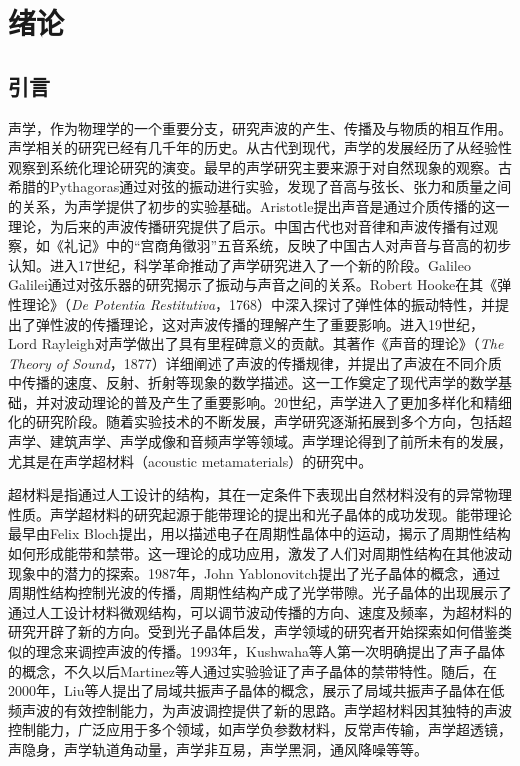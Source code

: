 \chapter{绪论}

\section{引言}
声学，作为物理学的一个重要分支，研究声波的产生、传播及与物质的相互作用。声学相关的研究已经有几千年的历史。从古代到现代，声学的发展经历了从经验性观察到系统化理论研究的演变。最早的声学研究主要来源于对自然现象的观察。古希腊的Pythagoras通过对弦的振动进行实验，发现了音高与弦长、张力和质量之间的关系，为声学提供了初步的实验基础。Aristotle提出声音是通过介质传播的这一理论，为后来的声波传播研究提供了启示。中国古代也对音律和声波传播有过观察，如《礼记》中的“宫商角徵羽”五音系统，反映了中国古人对声音与音高的初步认知。进入17世纪，科学革命推动了声学研究进入了一个新的阶段。Galileo Galilei通过对弦乐器的研究揭示了振动与声音之间的关系。Robert Hooke在其《弹性理论》（\textit{De Potentia Restitutiva}，1768）中深入探讨了弹性体的振动特性，并提出了弹性波的传播理论，这对声波传播的理解产生了重要影响。进入19世纪，Lord Rayleigh对声学做出了具有里程碑意义的贡献。其著作《声音的理论》（\textit{The Theory of Sound}，1877）详细阐述了声波的传播规律，并提出了声波在不同介质中传播的速度、反射、折射等现象的数学描述。这一工作奠定了现代声学的数学基础，并对波动理论的普及产生了重要影响。20世纪，声学进入了更加多样化和精细化的研究阶段。随着实验技术的不断发展，声学研究逐渐拓展到多个方向，包括超声学、建筑声学、声学成像和音频声学等领域。声学理论得到了前所未有的发展，尤其是在声学超材料（acoustic metamaterials）的研究中。

超材料是指通过人工设计的结构，其在一定条件下表现出自然材料没有的异常物理性质。声学超材料的研究起源于能带理论的提出和光子晶体的成功发现。能带理论最早由Felix Bloch提出\cite{a1}，用以描述电子在周期性晶体中的运动，揭示了周期性结构如何形成能带和禁带。这一理论的成功应用，激发了人们对周期性结构在其他波动现象中的潜力的探索。1987年，John Yablonovitch提出了光子晶体的概念\cite{a2}，通过周期性结构控制光波的传播，周期性结构产成了光学带隙。光子晶体的出现展示了通过人工设计材料微观结构，可以调节波动传播的方向、速度及频率，为超材料的研究开辟了新的方向\cite{a3,a4,a5}。受到光子晶体启发，声学领域的研究者开始探索如何借鉴类似的理念来调控声波的传播。1993年，Kushwaha等人第一次明确提出了声子晶体的概念\cite{b1}，不久以后Martinez等人通过实验验证了声子晶体的禁带特性\cite{b2,b3}。随后，在2000年，Liu等人提出了局域共振声子晶体的概念\cite{b4}，展示了局域共振声子晶体在低频声波的有效控制能力，为声波调控提供了新的思路。声学超材料因其独特的声波控制能力，广泛应用于多个领域，如声学负参数材料\cite{c11,c12,c13,c14,c15,c16,c17,c18}，反常声传输\cite{c21,c22,c23,c24,c25,c26,c27,c28,c29,c210,c211,c212}，声学超透镜\cite{c31,c32,c33,c34,c35,c36,c37,c38,c39,c3-add,c310,c311,c312,c313,c314}，声隐身\cite{c41,c42,c43,c44,c45,c46}，声学轨道角动量\cite{c51,c52,c53,c54,c55,c56,c57,c58,c59,c510,c511,c512}，声学非互易\cite{c61,c62,c63,c64,c65,c66,c67}，声学黑洞\cite{c71,c72,c73,c74,c75,c76,c77,c78,c79,c710}，通风降噪\cite{c81,c82,c83,c84,c85}等等。


